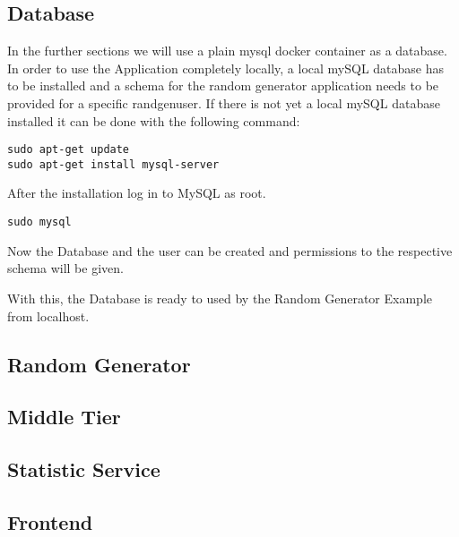 \subsection{Database}
In the further sections we will use a plain mysql docker container as a database. In order to use the Application completely locally, a local mySQL database has to be installed and a schema for the random generator application needs to be provided for a specific randgenuser.
If there is not yet a local mySQL database installed it can be done with the following command:
\begin{verbatim}
sudo apt-get update
sudo apt-get install mysql-server
\end{verbatim}

After the installation log in to MySQL as root. 
\begin{verbatim}
sudo mysql
\end{verbatim}
Now the Database and the user can be created and permissions to the respective schema will be given.

With this, the Database is ready to used by the Random Generator Example from localhost.
\newpage
\subsection{Random Generator}


\newpage

\subsection{Middle Tier}



\newpage

\subsection{Statistic Service}

\newpage
\subsection{Frontend}


